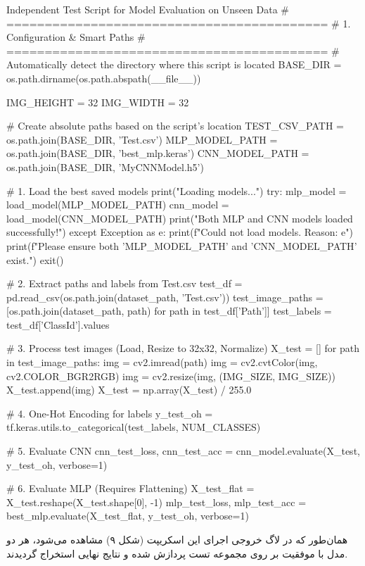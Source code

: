 \documentclass{article}
\begin{document}
\begin{latin}
	\begin{vscodewindow}{Independent Test Script for Model Evaluation on Unseen Data}
# ==========================================
# 1. Configuration & Smart Paths
# ==========================================
# Automatically detect the directory where this script is located
BASE_DIR = os.path.dirname(os.path.abspath(__file__))

IMG_HEIGHT = 32
IMG_WIDTH = 32

# Create absolute paths based on the script's location
TEST_CSV_PATH = os.path.join(BASE_DIR, 'Test.csv')
MLP_MODEL_PATH = os.path.join(BASE_DIR, 'best_mlp.keras')
CNN_MODEL_PATH = os.path.join(BASE_DIR, 'MyCNNModel.h5')

# 1. Load the best saved models
print("Loading models...")
try:
    mlp_model = load_model(MLP_MODEL_PATH)
    cnn_model = load_model(CNN_MODEL_PATH)
    print("Both MLP and CNN models loaded successfully!")
except Exception as e:
    print(f"\n[ERROR] Could not load models. Reason: {e}")
    print(f"Please ensure both '{MLP_MODEL_PATH}' and '{CNN_MODEL_PATH}' exist.")
    exit()



# 2. Extract paths and labels from Test.csv
test_df = pd.read_csv(os.path.join(dataset_path, 'Test.csv'))
test_image_paths = [os.path.join(dataset_path, path) for path in test_df['Path']]
test_labels = test_df['ClassId'].values

# 3. Process test images (Load, Resize to 32x32, Normalize)
X_test = []
for path in test_image_paths:
    img = cv2.imread(path)
    img = cv2.cvtColor(img, cv2.COLOR_BGR2RGB)
    img = cv2.resize(img, (IMG_SIZE, IMG_SIZE))
    X_test.append(img)
X_test = np.array(X_test) / 255.0

# 4. One-Hot Encoding for labels
y_test_oh = tf.keras.utils.to_categorical(test_labels, NUM_CLASSES)

# 5. Evaluate CNN
cnn_test_loss, cnn_test_acc = cnn_model.evaluate(X_test, y_test_oh, verbose=1)

# 6. Evaluate MLP (Requires Flattening)
X_test_flat = X_test.reshape(X_test.shape[0], -1)
mlp_test_loss, mlp_test_acc = best_mlp.evaluate(X_test_flat, y_test_oh, verbose=1)
	\end{vscodewindow}
\end{latin}

همان‌طور که در لاگ خروجی اجرای این اسکریپت (شکل ۹) مشاهده می‌شود، هر دو مدل با موفقیت بر روی مجموعه تست پردازش شده و نتایج نهایی استخراج گردیدند.
\end{document}

